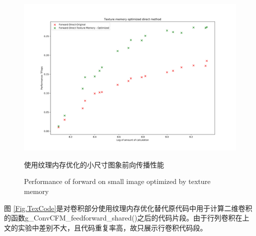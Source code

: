 \begin{figure}
	\centering
	\includegraphics[width=15cm]{figures/CNN-HALF-TEXOPT.jpg}
	\renewcommand{\thefigure}{\arabic{section}-\arabic{figure} }
	\renewcommand{\figurename}{图}
	\caption{使用纹理内存优化的小尺寸图象前向传播性能}
	\addtocounter{figure}{-1}
	\renewcommand{\thefigure}{\arabic{section}-\arabic{figure} }
	\renewcommand{\figurename}{Figure}
	\caption{Performance of forward on small image optimized by texture memory}
	\label{Fig.TEXVSSHARED}
\end{figure}
\par 图 \ref{Fig.TexCode}是对卷积部分使用纹理内存优化替代原代码中用于计算二维卷积的函数g\_ConvCFM\_feedforward\_shared()之后的代码片段。由于行列卷积在上文的实验中差别不大，且代码重复率高，故只展示行卷积代码段。

